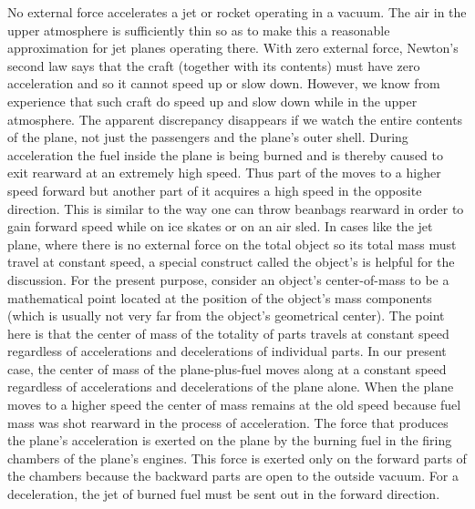 {
No external force accelerates a jet or rocket operating in a vacuum.
The air in the upper atmosphere is sufficiently thin so as to make this
a reasonable approximation for jet planes operating there.
With zero external force, Newton's second law says that the craft (together with its
contents) must have zero acceleration and so it cannot speed up or slow down.
However, we know from experience that such craft do speed up and slow down
while in the upper atmosphere.
The apparent discrepancy disappears if we watch the entire contents of the plane, not just
the passengers and the plane's outer shell.
During acceleration the fuel inside the plane is being burned and is thereby caused to
exit rearward at an extremely high speed.
Thus part of the  moves to a higher speed forward but another part
of it acquires a high speed in the opposite direction.
This is similar to the way one can throw beanbags rearward in order to gain forward speed
while on ice skates or on an air sled.
In cases like the jet plane, where there is no external force on the total object
so its total mass must travel at constant speed, a special construct called the object's 
%
%
is helpful for the discussion.
For the present purpose, consider an object's center-of-mass to be a mathematical point
located at the  position of the object's mass components (which is usually not very
far from the object's geometrical center).
The point here is that the center of mass of the totality of parts travels at constant speed
regardless of accelerations and decelerations of individual parts.
In our present case, the center of mass of the plane-plus-fuel moves along at a constant speed
regardless of accelerations and decelerations of the plane alone.
When the plane moves to a higher speed the center of mass remains at the old speed because
fuel mass was shot rearward in the process of acceleration.
The force that produces the plane's acceleration is exerted on the plane by the burning
fuel in the firing chambers of the plane's engines.
This force is exerted only on the forward parts of the chambers because the backward parts
are open to the outside vacuum.
For a deceleration, the jet of burned fuel must be sent out in the forward direction.
}%
